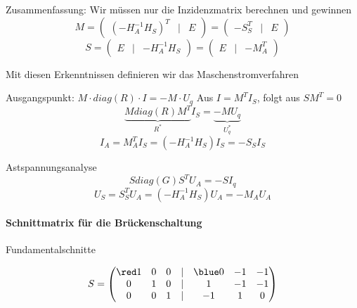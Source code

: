 \documentclass[german]{article}
\begin{document}
Zusammenfassung: Wir müssen nur die Inzidenzmatrix berechnen und gewinnen
\[
	M = \begin{pmatrix} ( -H_A^{-1} H_S )^T & | & E \end{pmatrix} = \begin{pmatrix} - S_S^T & | & E \end{pmatrix}
\]
\[
	S = \begin{pmatrix} E & | & -H_A^{-1} H_S \end{pmatrix} = \begin{pmatrix} E & | & - M_A^T \end{pmatrix}
\]

Mit diesen Erkenntnissen definieren wir das Maschenstromverfahren

Ausgangspunkt: $M \cdot diag(R) \cdot I = -M \cdot U_q$ Aus $I = M^T I_S$, folgt aus $S M^T = 0$
\[
	\underbrace{M diag(R) M^T}_{R^*} I_S = \underbrace{-M U_q}_{U_q^*}
\]
\[
	I_A = M_A^T I_S = ( -H_A^{-1} H_S ) I_S = - S_S I_S
\]

Astspannungsanalyse
\[
	S diag(G) S^T U_A = -S I_q
\]
\[
	U_S = S_S^T U_A = ( -H_A^{-1} H_S ) U_A = - M_A U_A
\]

\paragraph{Schnittmatrix für die Brückenschaltung}

Fundamentalschnitte

\[
	S =
	\begin{pmatrix}
		{\red 1} & 0 & 0 & | & {\blue 0} & -1 & -1 \\
		0 & 1 & 0 & | & 1 & -1 & -1 \\
		0 & 0 & 1 & | & -1 & 1 & 0
	\end{pmatrix}
\]
\end{document}
